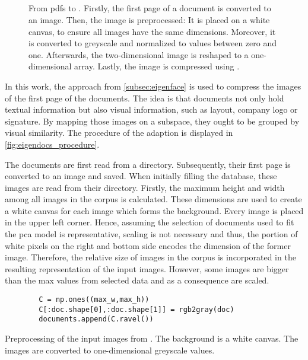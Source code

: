 \subsection{\eigendocs{}}\label{subsubsec:eigendocs}

\begin{figure}[htp] %
    \centering
    
    \caption[\eigendocs{} procedure]{From \acp{pdf} to \eigendocs{}.
    Firstly, the first page of a document is converted to an image.
    Then, the image is preprocessed:
    It is placed on a white canvas, to ensure all images have the same dimensions.
    Moreover, it is converted to greyscale and normalized to values between zero and one.
    Afterwards, the two-dimensional image is reshaped to a one-dimensional array.
    Lastly, the image is compressed using \eigendocs{}.
    }
    \label{fig:eigendocs_procedure}
\end{figure}

In this work, the \eigenfaces{} approach from \autoref{subsec:eigenface} is used to compress the images of the first page of the documents.
The idea is that documents not only hold textual information but also visual information, such as layout, company logo or signature.
By mapping those images on a subspace, they ought to be grouped by visual similarity.
The procedure of the \eigenfaces{} adaption \textit{\eigendocs{}} is displayed in \autoref{fig:eigendocs_procedure}.

The documents are first read from a directory. 
Subsequently, their first page is converted to an image and saved.
When initially filling the database, these images are read from their directory.
Firstly, the maximum height and width among all images in the corpus is calculated.
These dimensions are used to create a white canvas for each image which forms the background.
Every image is placed in the upper left corner.
Hence, assuming the selection of documents used to fit the \ac{pca} model is representative, 
scaling is not necessary and thus, the portion of white pixels on the right and bottom side encodes the dimension of the former image.
Therefore, the relative size of images in the corpus is incorporated in the resulting representation of the input images.
However, some images are bigger than the max values from selected data and as a consequence are scaled.

\begin{listing}[htp]
    \begin{verbatim}
        C = np.ones((max_w,max_h))
        C[:doc.shape[0],:doc.shape[1]] = rgb2gray(doc)
        documents.append(C.ravel())
    \end{verbatim}
    \caption[Preprocessing of the input images]{Preprocessing of the input images from \thesissupervisor{}.
    The background is a white canvas.
    The images are converted to one-dimensional greyscale values.}
    \label{lst:preproc_images}
\end{listing}

